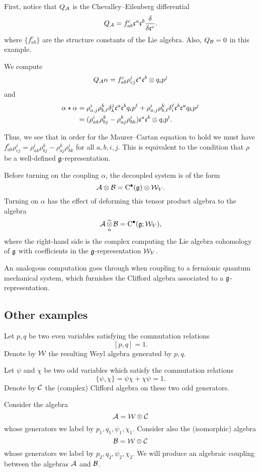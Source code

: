 \documentclass[11pt]{amsart}
\begin{document}
First, notice that $Q_{\mathcal A}$ is the Chevalley--Eilenberg differential 
\[
Q_{\mathcal A} = f_{ab}^c \mathfrak c^a \mathfrak c^b \frac{\delta}{\delta \mathfrak c^c} .
\]
where $\{f_{ab}^c\}$ are the structure constants of the Lie algebra. 
Also, $Q_{\mathcal B} = 0$ in this example. 

We compute
\[
Q_{\mathcal A} \alpha = f_{ab}^c \rho_{cj}^i \mathfrak c^a \mathfrak c^b \otimes q_i p^j 
\]
and
\begin{align*}
\alpha \star \alpha & = \rho_{a,j}^i \rho_{b,\ell}^k \delta^j_k \mathfrak c^a \mathfrak c^b q_i p^\ell + \rho_{a,j}^i \rho_{b,\ell}^k \delta^\ell_i \mathfrak c^b \mathfrak c^a q_k p^j   \\
& = (\rho_{ak}^i \rho_{bj}^k  - \rho_{aj}^k \rho^i_{bk}) \mathfrak c^a \mathfrak c^b \otimes q_i p^l .
\end{align*}

Thus, we see that in order for the Maurer--Cartan equation to hold we must have $f_{ab}^c \rho_{cj}^i = \rho_{ak}^i \rho_{bj}^k  - \rho_{aj}^k \rho^i_{bk}$ for all $a,b,i,j$.
This is equivalent to the condition that $\rho$ be a well-defined $\mathfrak g$-representation. 

Before turning on the coupling $\alpha$, the decoupled system is of the form
\[
\mathcal A \otimes \mathcal B = {\rm C}^\bullet(\mathfrak g) \otimes \mathcal W_V . 
\]
Turning on $\alpha$ has the effect of deforming this tensor product algebra to the algebra
\[
\mathcal A \, \underset{\alpha}{\widetilde{\otimes}} \, \mathcal B = {\rm C}^\bullet(\mathfrak g ; \mathcal W_V) ,
\]
where the right-hand side is the complex computing the Lie algebra cohomology of $\mathfrak g$ with coefficients in the $\mathfrak g$-representation $\mathcal W_V$. 

An analogous computation goes through when coupling to a fermionic quantum mechanical system, which furnishes the Clifford algebra associated to a $\mathfrak g$-representation.

\subsection{Other examples}

Let $p,q$ be two even variables satisfying the commutation relations
\[
[p,q] = 1.
\]
Denote by $\mathcal W$ the resulting Weyl algebra generated by $p,q$.
 
Let $\psi$ and $\chi$ be two odd variables which satisfy the commutation relations
\[
\{\psi, \chi\} = \psi \chi + \chi \psi = 1.
\]
Denote by $\mathcal C$ the (complex) Clifford algebra on these two odd generators.

Consider the algebra 
\[
\mathcal A = \mathcal W \otimes \mathcal C 
\]
whose generators we label by $p_1,q_1,\psi_1,\chi_1$.
Consider also the (isomorphic) algebra
\[
\mathcal B = \mathcal W \otimes \mathcal C
\]
whose generators we label by $p_2,q_2,\psi_2,\chi_2$.
We will produce an algebraic coupling between the algebras $\mathcal A$ and $\mathcal B$. 
\end{document}
